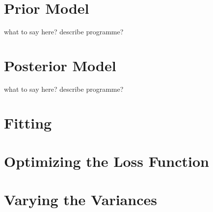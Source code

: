     \section{Prior Model}
    what to say here? describe programme?
    \section{Posterior Model}
    what to say here? describe programme?

    \section{Fitting}

    \section{Optimizing the Loss Function}

    \section{Varying the Variances}
